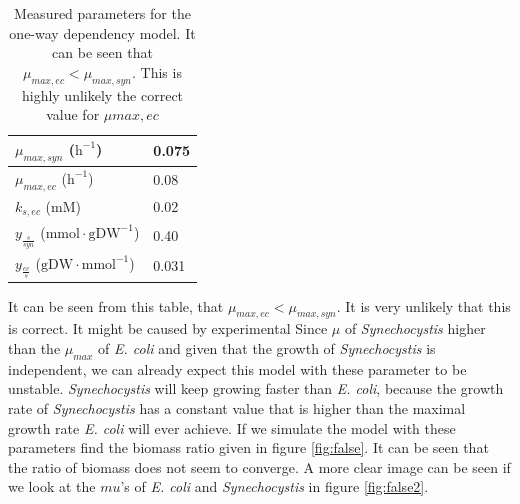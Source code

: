 \documentclass[10pt]{report}
\begin{document}
\begin{table}[!ht]
 \begin{center}  
  \begin{tabular}{|l|l|}
   \hline
   $\mu_{max,syn}$ ($\text{h}^{-1}$) & 0.075 \\ \hline
   $\mu_{max,ec}$ ($\text{h}^{-1}$) & 0.08 \\ \hline
   $k_{s,ec}$ ($\text{mM}$) & 0.02 \\ \hline
   $y_{\frac{s}{syn}}$ ($\text{mmol}\cdot\text{gDW}^{-1}$) & 0.40 \\ \hline
   $y_{\frac{ec}{s}}$ ($\text{gDW}\cdot\text{mmol}^{-1}$) & 0.031 \\
   \hline   
  \end{tabular}
  \caption{Measured parameters for the one-way dependency model. It can be seen that $\mu_{max,ec} < \mu_{max,syn}$. This is highly unlikely the correct value for $\mu{max,ec}$}
  \label{tab:ol}
 \end{center}
\end{table}

It can be seen from this table, that $\mu_{max,ec} < \mu_{max,syn}$. It is very unlikely that this is correct. It might be caused by experimental Since $\mu$ of \textit{Synechocystis} higher than the $\mu_{max}$ of \textit{E. coli} and given that the growth of \textit{Synechocystis} is independent, we can already expect this model with these parameter to be unstable. \textit{Synechocystis} will keep growing faster than \textit{E. coli}, because the growth rate of \textit{Synechocystis} has a constant value that is higher than the maximal growth rate \textit{E. coli} will ever achieve. If we simulate the model with these parameters find the biomass ratio given in figure \ref{fig:false}. It can be seen that the ratio of biomass does not seem to converge. A more clear image can be seen if we look at the $mu$'s of \textit{E. coli} and \textit{Synechocystis} in figure \ref{fig:false2}.
\end{document}
